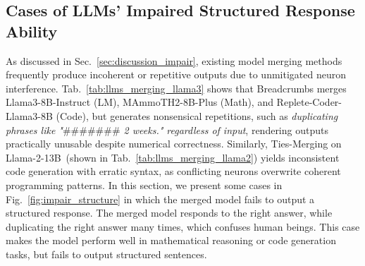 

\subsection{Cases of LLMs’ Impaired Structured Response Ability}
\label{sec:appendix_impair_structed_response}
As discussed in Sec.~\ref{sec:discussion_impair}, existing model merging methods frequently produce incoherent or repetitive outputs due to unmitigated neuron interference. Tab.~\ref{tab:llms_merging_llama3} shows that Breadcrumbs merges Llama3-8B-Instruct (LM), MAmmoTH2-8B-Plus (Math), and Replete-Coder-
Llama3-8B (Code), but generates nonsensical repetitions, such as \textit{duplicating phrases like "$\text{\#\#\#\#\#\#\#}$ 2 weeks." regardless of input}, rendering outputs practically unusable despite numerical correctness.
Similarly, Ties-Merging on Llama-2-13B~(shown in Tab.~\ref{tab:llms_merging_llama2}) yields inconsistent code generation with erratic syntax, as conflicting neurons overwrite coherent programming patterns. 
In this section, we present some cases in Fig.~\ref{fig:impair_structure} in which the merged model fails to output a structured response. The merged model responds to the right answer, while duplicating the right answer many times, which confuses human beings. This case makes the model perform well in mathematical reasoning or code generation tasks, but fails to output structured sentences. 





